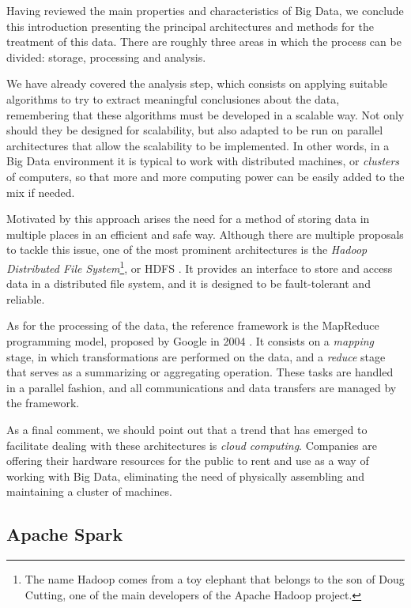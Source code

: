 Having reviewed the main properties and characteristics of Big Data, we conclude this introduction presenting the principal architectures and methods for the treatment of this data. There are roughly three areas in which the process can be divided: storage, processing and analysis.

We have already covered the analysis step, which consists on applying suitable algorithms to try to extract meaningful conclusiones about the data, remembering that these algorithms must be developed in a scalable way. Not only should they be designed for scalability, but also adapted to be run on parallel architectures that allow the scalability to be implemented. In other words, in a Big Data environment it is typical to work with distributed machines, or \textit{clusters} of computers, so that more and more computing power can be easily added to the mix if needed.

Motivated by this approach arises the need for a method of storing data in multiple places in an efficient and safe way. Although there are multiple proposals to tackle this issue, one of the most prominent architectures is the \textit{Hadoop Distributed File System}\footnote{The name Hadoop comes from a toy elephant that belongs to the son of Doug Cutting, one of the main developers of the Apache Hadoop project.}, or HDFS \cite{chansler2010hdfs}. It provides an interface to store and access data in a distributed file system, and it is designed to be fault-tolerant and reliable.

As for the processing of the data, the reference framework is the MapReduce programming model, proposed by Google in 2004 \cite{dean2004mapreduce}. It consists on a \textit{mapping} stage, in which transformations are performed on the data, and a \textit{reduce} stage that serves as a summarizing or aggregating operation. These tasks are handled in a parallel fashion, and all communications and data transfers are managed by the framework.

As a final comment, we should point out that a trend that has emerged to facilitate dealing with these architectures is \textit{cloud computing}. Companies are offering their hardware resources for the public to rent and use as a way of working with Big Data, eliminating the need of physically assembling and maintaining a cluster of machines.

\subsection{Apache Spark}


